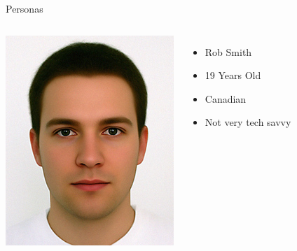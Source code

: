 \documentclass{beamer}
\begin{document}
\begin{frame}{Personas}
    \begin{columns}[c]
        \center\includegraphics[height=0.5 \textheight]{bios/guy.jpg}
        \begin{itemize}
            \item Rob Smith
            \item 19 Years Old
            \item Canadian
            \item Not very tech savvy
        \end{itemize}

\end{columns}
\end{frame}
\end{document}
